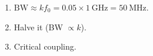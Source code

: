 \begin{enumerate}[leftmargin=1.6em,itemsep=2pt]
\item $\text{BW} \approx k f_0 = 0.05\times1\ \text{GHz} = 50\ \text{MHz}$.
\item Halve it (BW $\propto k$).
\item Critical coupling.
\end{enumerate}
